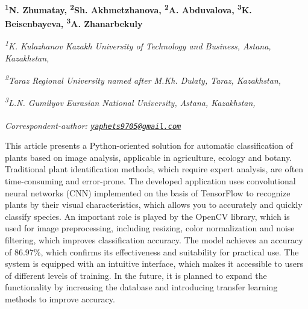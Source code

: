 
\begin{articleheader}

{\bfseries
\textsuperscript{1}N. Zhumatay,
\textsuperscript{2}Sh. Akhmetzhanova,
\textsuperscript{2}A. Abduvalova,
\textsuperscript{3}K. Beisenbayeva,
\textsuperscript{3}A. Zhanarbekuly\textsuperscript{\envelope } }
\end{articleheader}

\begin{affiliation}
\emph{\textsuperscript{1}K. Kulazhanov Kazakh University of Technology and Business, Astana, Kazakhstan,}

\emph{\textsuperscript{2}Taraz Regional University named after M.Kh. Dulaty, Taraz, Kazakhstan,}

\emph{\textsuperscript{3}L.N. Gumilyov Eurasian National University, Astana, Kazakhstan,}

\raggedright \textsuperscript{\envelope }{\em Correspondent-author: \href{mailto:yaphets9705@gmail.com}{\nolinkurl{yaphets9705@gmail.com}}}
\end{affiliation}

This article presents a Python-oriented solution for automatic
classification of plants based on image analysis, applicable in
agriculture, ecology and botany. Traditional plant identification
methods, which require expert analysis, are often time-consuming and
error-prone. The developed application uses convolutional neural
networks (CNN) implemented on the basis of TensorFlow to recognize
plants by their visual characteristics, which allows you to accurately
and quickly classify species. An important role is played by the OpenCV
library, which is used for image preprocessing, including resizing,
color normalization and noise filtering, which improves classification
accuracy. The model achieves an accuracy of 86.97\%, which confirms its
effectiveness and suitability for practical use. The system is equipped
with an intuitive interface, which makes it accessible to users of
different levels of training. In the future, it is planned to expand the
functionality by increasing the database and introducing transfer
learning methods to improve accuracy.

